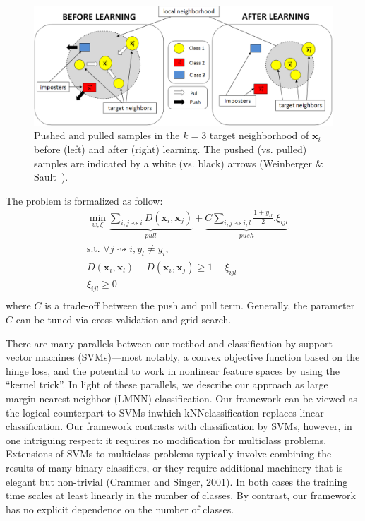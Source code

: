 \begin{figure}[h!]
	\begin{minipage}[b]{1.0\linewidth}
		\centering
		\centerline{\includegraphics[width=0.8\linewidth]{./images/TargetImposterRepresentationCao}}
	\end{minipage}
	\caption{Pushed and pulled samples in the $k=3$ target neighborhood of $\textbf{x}_i$ before (left) and after (right) learning. The pushed (vs. pulled) samples are indicated by a white (vs. black) arrows (Weinberger \& Sault~\cite{Weinberger2009}).}
	\label{fig:TargetImposterRepresentation}
\end{figure}

\noindent The problem is formalized as follow:
\begin{equation}
	\begin{aligned}
	&\displaystyle 		\min_{w,\xi}\underbrace{
		\sum\limits_{i,j \rightsquigarrow i}
		D(\textbf{x}_{i},\textbf{x}_{j})
	}_{pull}
	+
	\underbrace{
		C\sum\limits_{i,j \rightsquigarrow i,l} \frac{1+y_{il}}{2}.\xi_{ijl}
	}
	_{push} \\
	&\text{s.t.  } \forall j \rightsquigarrow i, y_l\neq y_i, \\
	& D(\textbf{x}_{i},\textbf{x}_{l})-D(\textbf{x}_{i},\textbf{x}_{j}) \geq 1-\xi_{ijl} \\
	& \xi_{ijl} \geq 0 \\
	\label{eq:OptimizationProblem}
	\end{aligned}
\end{equation}
\noindent where $C$ is a trade-off between the push and pull term. Generally, the parameter $C$ can be tuned via cross validation and grid search.


There are many parallels between our method and classification by support vector machines
(SVMs)—most notably, a convex objective function based on the hinge loss, and the potential to work in nonlinear feature spaces by using the “kernel trick”. In light of these parallels, we describe our approach as large margin nearest neighbor (LMNN) classification. Our framework can be viewed as the logical counterpart to SVMs inwhich kNNclassification replaces linear classification. Our framework contrasts with classification by SVMs, however, in one intriguing respect: it
requires no modification for multiclass problems. Extensions of SVMs to multiclass problems typically involve combining the results of many binary classifiers, or they require additional machinery that is elegant but non-trivial (Crammer and Singer, 2001). In both cases the training time scales at least linearly in the number of classes. By contrast, our framework has no explicit dependence on the number of classes.

